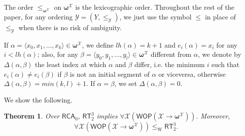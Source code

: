 \documentclass{amsart}
\newcommand\RCA{\mathsf{RCA}}
\newcommand\RT{\mathsf{RT}}
\newcommand\WOP{\mathsf{WOP}}
\newcommand\W{\mathrm{W}}
\newcommand{\LoX}{\mathcal{X}}
\newcommand\boldomega{\pmb{\omega}}
\newtheorem{theorem}{Theorem}
\begin{document}
The order $\leq_{\boldomega^{\LoX}}$ on $\boldomega^{\LoX}$ is the lexicographic order. Throughout the rest of the paper, for any ordering $\mathcal{Y} = (Y, \leq_{\mathcal{Y}})$, we just use the symbol $\leq$ in place of $\leq_{\mathcal{Y}}$ when there is no risk of ambiguity.

If $\alpha = \langle x_0,x_1,\dots,x_k \rangle \in \boldomega^\LoX$, we define $lh(\alpha) = k+1$ and $e_i(\alpha) = x_i$ for any $i < lh(\alpha)$; also, for any $\beta = \langle y_0,y_1,\dots,y_l \rangle \in \boldomega^\LoX$ different from $\alpha$, we denote by $\Delta(\alpha,\beta)$ the least index at which $\alpha$ and $\beta$ differ, i.e. the minimum $i$ such that $e_i(\alpha) \neq e_i(\beta)$ if $\beta$ is not an initial segment of $\alpha$ or viceversa, otherwise $\Delta(\alpha,\beta) = min(k,l)+1$. If $\alpha = \beta$, we set $\Delta(\alpha,\beta) = 0$.

\smallskip

We show the following.

\begin{theorem}\label{prop:RT3}
Over $\RCA_0$, $\RT^3_2$ implies $\forall \LoX (\WOP(\LoX \to \boldomega^\LoX))$.
Moreover, 
$$\forall \LoX (\WOP(\LoX \to \boldomega^\LoX)) \leq_\W \RT^3_2.$$
\end{theorem}
\end{document}
